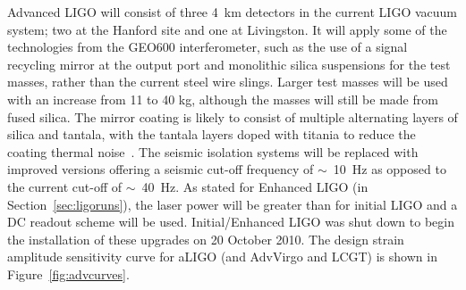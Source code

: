 Advanced LIGO will consist of three 4~km detectors in the current LIGO vacuum
system; two at the Hanford site and one at
Livingston. It will apply some of the technologies from the GEO600
interferometer, such as the use of a signal recycling mirror at the output port
and monolithic silica suspensions for the test masses, rather than the current
steel wire slings. Larger test masses will be used with an increase from 11 to
40 kg, although the masses will still be made from fused silica. The mirror
coating is likely to consist of multiple alternating layers of silica and
tantala, with the tantala layers doped with titania to reduce the coating
thermal noise~\cite{Agresti:2006}. The seismic isolation systems will be
replaced with improved versions offering a seismic cut-off frequency
of $\sim$~10~Hz as opposed to the current cut-off of $\sim$~40~Hz. As
stated for Enhanced LIGO (in Section~\ref{sec:ligoruns}), the laser
power will be greater than for initial LIGO and a DC readout scheme
will be used. Initial/Enhanced LIGO was shut down to begin the
installation of these upgrades on 20 October 2010. The design strain
amplitude sensitivity curve for aLIGO (and AdvVirgo and LCGT) is shown
in Figure~\ref{fig:advcurves}.
